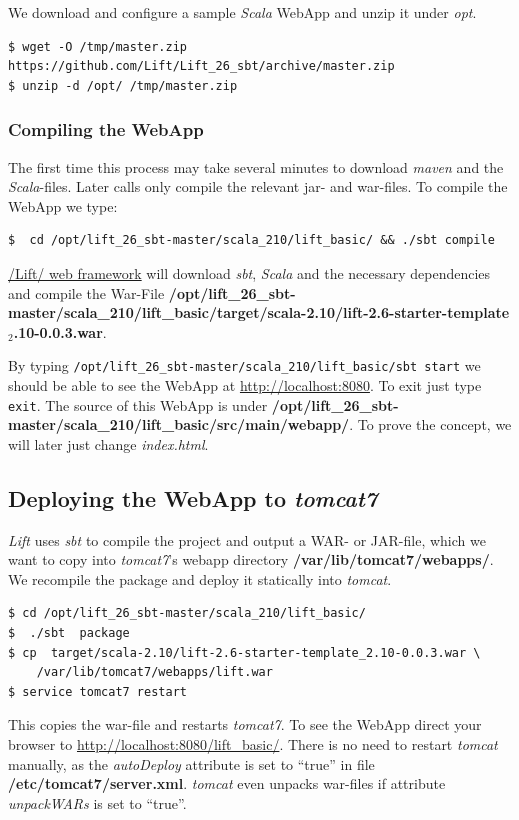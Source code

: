 \documentclass[11pt]{article}
\begin{document}
We download and configure a sample \emph{Scala} WebApp and unzip it under \emph{opt}.

\begin{verbatim}
$ wget -O /tmp/master.zip https://github.com/Lift/Lift_26_sbt/archive/master.zip
$ unzip -d /opt/ /tmp/master.zip
\end{verbatim}
\subsubsection{Compiling the WebApp}
\label{sec-4-3-2}

The first time this process may take several minutes to download \emph{maven} and the \emph{Scala}-files. Later calls only compile the relevant jar- and war-files. To compile the WebApp we type:

\begin{verbatim}
$  cd /opt/lift_26_sbt-master/scala_210/lift_basic/ && ./sbt compile
\end{verbatim}

\href{http:///Lift/web.net/getting_started}{/Lift/ web framework}  will download \emph{sbt}, \emph{Scala} and the necessary dependencies and compile the War-File \textbf{/opt/lift\_26\_sbt-master/scala\_210/lift\_basic/target/scala-2.10/lift-2.6-starter-template$_2$.10-0.0.3.war}. 
 
By typing \texttt{/opt/lift\_26\_sbt-master/scala\_210/lift\_basic/sbt  start} we should be able to see the WebApp at \href{http://localhost:8080}{http://localhost:8080}. To exit just type \texttt{exit}. The source of this WebApp is under \textbf{/opt/lift\_26\_sbt-master/scala\_210/lift\_basic/src/main/webapp/}. To prove the concept, we will later just change \emph{index.html}.
\subsection{Deploying the WebApp to \emph{tomcat7}}
\label{sec-4-4}

\emph{Lift} uses \emph{sbt} to compile the project and output a WAR- or JAR-file, which we want to copy into \emph{tomcat7}'s webapp directory \textbf{/var/lib/tomcat7/webapps/}. We recompile the package and deploy it statically into \emph{tomcat}.

\begin{verbatim}
$ cd /opt/lift_26_sbt-master/scala_210/lift_basic/
$  ./sbt  package
$ cp  target/scala-2.10/lift-2.6-starter-template_2.10-0.0.3.war \
    /var/lib/tomcat7/webapps/lift.war
$ service tomcat7 restart
\end{verbatim}
This copies the war-file and restarts \emph{tomcat7}. To see the WebApp direct your browser to \href{http://localhost:8080/lift_basic/}{http://localhost:8080/lift\_basic/}. There is no need to restart \emph{tomcat} manually, as the \emph{autoDeploy} attribute is set to ``true'' in file \textbf{/etc/tomcat7/server.xml}. \emph{tomcat} even unpacks war-files if attribute \emph{unpackWARs} is set to ``true''.
\end{document}
